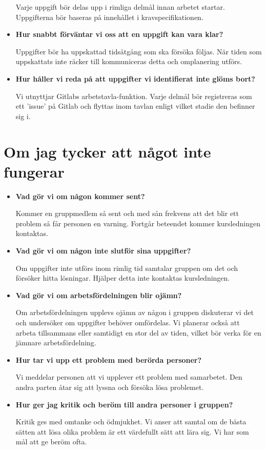 \documentclass{mall}
\begin{document}
\begin{itemize}
  Varje uppgift bör delas upp i rimliga delmål innan arbetet startar. Uppgifterna bör baseras på innehållet i kravspecifikationen.

\item \textbf{Hur snabbt förväntar vi oss att en uppgift kan vara klar?}

  Uppgifter bör ha uppskattad tidsåtgång som ska försöka följas. När tiden som uppskattats inte räcker till kommuniceras detta och omplanering utförs.

\item \textbf{Hur håller vi reda på att uppgifter vi identifierat inte glöms bort?}

  Vi utnyttjar Gitlabs arbetstavla-funktion. Varje delmål bör registreras som ett 'issue' på Gitlab och flyttas inom tavlan enligt vilket stadie den befinner sig i.

\end{itemize}

\section{Om jag tycker att något inte fungerar}

\begin{itemize}
\item \textbf{Vad gör vi om någon kommer sent?}

  Kommer en gruppmedlem så sent och med sån frekvens att det blir ett problem så får personen en varning. Fortgår beteendet kommer kursledningen kontaktas.

\item \textbf{Vad gör vi om någon inte slutför sina uppgifter?}

  Om uppgifter inte utförs inom rimlig tid samtalar gruppen om det och försöker hitta lösningar. Hjälper detta inte kontaktas kursledningen.

\item \textbf{Vad gör vi om arbetsfördelningen blir ojämn?}

  Om arbetsfördelningen upplevs ojämn av någon i gruppen diskuterar vi det och undersöker om uppgifter behöver omfördelas. Vi planerar också att arbeta tillsammans eller samtidigt en stor del av tiden, vilket bör verka för en jämnare arbetsfördelning. 

\item \textbf{Hur tar vi upp ett problem med berörda personer?}

  Vi meddelar personen att vi upplever ett problem med samarbetet. Den andra parten åtar sig att lyssna och försöka lösa problemet. 

\item \textbf{Hur ger jag kritik och beröm till andra personer i gruppen?}

  Kritik ges med omtanke och ödmjukhet. Vi anser att samtal om de bästa sätten att lösa olika problem är ett värdefullt sätt att lära sig. 
Vi har som mål att ge beröm ofta.

\end{itemize}
\end{document}
